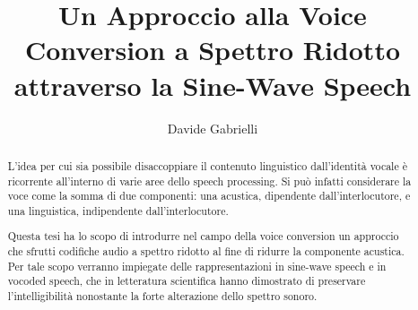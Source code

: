 \documentclass[binding=0.6cm,noexaminfo]{sapthesis}
\title{Un Approccio alla Voice Conversion a Spettro Ridotto attraverso la Sine-Wave Speech}
\author{Davide Gabrielli}
\begin{document}
	\frontmatter
	\maketitle
	
	\dedication{
		Ai miei genitori e mia sorella,\\
		che mi hanno da sempre supportato\\
		e dovuto ascoltare ogni mia spiegazione non richiesta di tutto questo.\\ \vspace{5mm}
		A Fiorella,\\
		che mi ha insegnato a scrivere in italiano, o che almeno ci ha provato,\\
		e mi ha detto sempre le cose giuste per tranquillizzarmi.\\ \vspace{5mm}
		Ai miei amici,\\
		che mi hanno sostenuto\\
		e dato modo di vedere ogni tanto luci diverse da quelle del monitor.\\ \vspace{5mm}
		Al mio gatto Luna,\\
		che mi ha sempre fatto compagnia nelle notti insonni a scrivere\\
		(a differenza di Maya che se la dormiva).
	}
	\begin{abstract}
	L'idea per cui sia possibile disaccoppiare il contenuto linguistico dall'identità vocale è ricorrente all'interno di varie aree dello speech processing. Si può infatti considerare la voce come la somma di due componenti: una acustica, dipendente dall'interlocutore, e una linguistica, indipendente dall'interlocutore.
	
	Questa tesi ha lo scopo di introdurre nel campo della voice conversion un approccio che sfrutti codifiche audio a spettro ridotto al fine di ridurre la componente acustica. Per tale scopo verranno impiegate delle rappresentazioni in sine-wave speech e in vocoded speech, che in letteratura scientifica hanno dimostrato di preservare l'intelligibilità nonostante la forte alterazione dello spettro sonoro.	
	\end{abstract}
	\tableofcontents
	\mainmatter
	
	
	
	
	
			
		
	
	
	

	
	
	\backmatter

	\cleardoublepage
\end{document}
